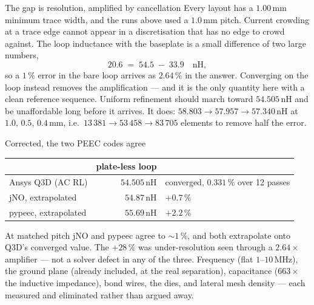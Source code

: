 \documentclass[aspectratio=169,8pt,t]{beamer}
\begin{document}
\begin{frame}{The gap is resolution, amplified by cancellation}
\vfill
{}\quad Every layout has a $1.00$\,mm minimum trace
width, and the runs above used a $1.0$\,mm pitch. Current crowding at a trace edge cannot appear in
a discretisation that has no edge to crowd against.
\vfill
{}\quad The loop inductance with the baseplate is a small
difference of two large numbers,
\[
  20.6 \;=\; 54.5 \;-\; 33.9 \quad\text{nH},
\]
so a $1\,\%$ error in the bare loop arrives as $2.64\,\%$ in the answer. Converging on the
 loop instead removes the amplification --- and it is the only quantity here with a
clean reference sequence.
\vfill
{}\quad Uniform refinement should march toward $54.505$\,nH and be
unaffordable long before it arrives. It does: $58.803 \to 57.957 \to 57.340$\,nH at $1.0$, $0.5$,
$0.4$\,mm, i.e.\ $13\,381 \to 53\,458 \to 83\,705$ elements to remove half the error.
\vfill
\end{frame}

\begin{frame}{Corrected, the two PEEC codes agree}
\vfill
\begin{center}
\begin{tabular}{lrl}
\toprule
 & plate-less loop & \\
\midrule
Ansys Q3D \textnormal{(AC RL)} & $54.505$\,nH & converged, $0.331\,\%$ over 12 passes \\
\midrule
jNO, extrapolated & $54.87$\,nH & $+0.7\,\%$ \\
pypeec, extrapolated & $55.69$\,nH & $+2.2\,\%$ \\
\bottomrule
\end{tabular}
\end{center}
\vfill
{}\quad At matched pitch jNO and pypeec agree to $\sim\!1\,\%$,
and both extrapolate onto Q3D's converged value. The $+28\,\%$ was under-resolution seen through a
$2.64\times$ amplifier --- not a solver defect in any of the three.
\vfill
{}\quad Frequency (flat $1$--$10$\,MHz), the ground plane
(already included, at the real separation), capacitance ($663\times$ the inductive impedance), bond
wires, the dies, and lateral mesh density --- each measured and eliminated rather than argued away.
\vfill
\end{frame}
\end{document}
